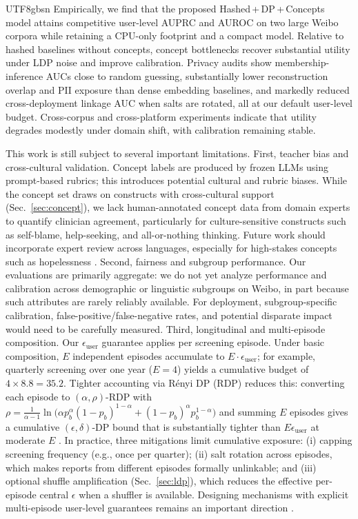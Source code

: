 \documentclass[lettersize,journal]{IEEEtran}
\begin{document}
\begin{CJK*}{UTF8}{gbsn}
Empirically, we find that the proposed Hashed\,+\,DP\,+\,Concepts model attains competitive user-level AUPRC and AUROC on two large Weibo corpora while retaining a CPU-only footprint and a compact model. Relative to hashed baselines without concepts, concept bottlenecks recover substantial utility under LDP noise and improve calibration. Privacy audits show membership-inference AUCs close to random guessing, substantially lower reconstruction overlap and PII exposure than dense embedding baselines, and markedly reduced cross-deployment linkage AUC when salts are rotated, all at our default user-level budget. Cross-corpus and cross-platform experiments indicate that utility degrades modestly under domain shift, with calibration remaining stable.

This work is still subject to several important limitations. First, teacher bias and cross-cultural validation. Concept labels are produced by frozen LLMs using prompt-based rubrics; this introduces potential cultural and rubric biases. While the concept set draws on constructs with cross-cultural support (Sec.~\ref{sec:concept}), we lack human-annotated concept data from domain experts to quantify clinician agreement, particularly for culture-sensitive constructs such as self-blame, help-seeking, and all-or-nothing thinking. Future work should incorporate expert review across languages, especially for high-stakes concepts such as hopelessness \cite{gilardi2023chatgptannotators,tan2024llmannotationSurvey}.
Second, fairness and subgroup performance. Our evaluations are primarily aggregate: we do not yet analyze performance and calibration across demographic or linguistic subgroups on Weibo, in part because such attributes are rarely reliably available. For deployment, subgroup-specific calibration, false-positive/false-negative rates, and potential disparate impact would need to be carefully measured.
Third, longitudinal and multi-episode composition. Our $\epsilon_{\text{user}}$ guarantee applies per screening episode. Under basic composition, $E$ independent episodes accumulate to $E \cdot \epsilon_{\text{user}}$; for example, quarterly screening over one year ($E{=}4$) yields a cumulative budget of $4 \times 8.8 = 35.2$. Tighter accounting via R\'enyi DP (RDP) reduces this: converting each episode to $(\alpha, \rho)$-RDP with $\rho = \frac{1}{\alpha-1}\ln\!\bigl(\alpha p_b^{\alpha}(1{-}p_b)^{1-\alpha} + (1{-}p_b)^{\alpha}p_b^{1-\alpha}\bigr)$ and summing $E$ episodes gives a cumulative $(\epsilon, \delta)$-DP bound that is substantially tighter than $E\epsilon_{\text{user}}$ at moderate $E$ \cite{duchi2013localprivacy,kairouz2015composition}. In practice, three mitigations limit cumulative exposure: (i) capping screening frequency (e.g., once per quarter); (ii) salt rotation across episodes, which makes reports from different episodes formally unlinkable; and (iii) optional shuffle amplification (Sec.~\ref{sec:ldp}), which reduces the effective per-episode central $\epsilon$ when a shuffler is available. Designing mechanisms with explicit multi-episode user-level guarantees remains an important direction \cite{acharya2023userldp}.

\end{CJK*}
\end{document}
